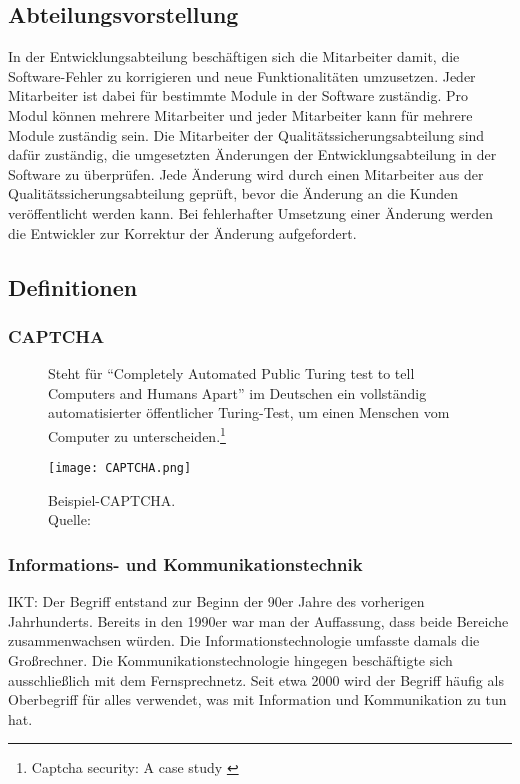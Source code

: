 \subsection{Abteilungsvorstellung}
In der Entwicklungsabteilung beschäftigen sich die Mitarbeiter damit, die Software-Fehler zu korrigieren und neue Funktionalitäten umzusetzen. Jeder Mitarbeiter ist dabei für bestimmte Module in der Software zuständig. Pro Modul können mehrere Mitarbeiter und jeder Mitarbeiter kann für mehrere Module zuständig sein. Die Mitarbeiter der Qualitätssicherungsabteilung sind dafür zuständig, die umgesetzten Änderungen der Entwicklungsabteilung in der Software zu überprüfen. Jede Änderung wird durch einen Mitarbeiter aus der Qualitätssicherungsabteilung geprüft, bevor die Änderung an die Kunden veröffentlicht werden kann. Bei fehlerhafter Umsetzung einer Änderung werden die Entwickler zur Korrektur der Änderung aufgefordert.

\subsection{Definitionen}

\subsubsection{CAPTCHA}
\begin{figure}[h]
	\begin{minipage}{0.5\textwidth}
		Steht für "`Completely Automated Public Turing test to tell Computers and Humans Apart"' im Deutschen ein vollständig automatisierter öffentlicher
		Turing-Test, um einen Menschen vom Computer zu unterscheiden.\footnote{Captcha security: A case study \cite{yan2009captcha}}
	\end{minipage}
	\hfill
	\begin{minipage}{0.4\textwidth}
		\texttt{[image: CAPTCHA.png]}
		\caption[Beispiel-CAPTCHA]{Beispiel-CAPTCHA. \\Quelle: \cite{yan2009captcha}}
	\end{minipage}
\end{figure}

\subsubsection{Informations- und Kommunikationstechnik}
\ac{IKT}: Der Begriff entstand zur Beginn der 90er Jahre des vorherigen Jahrhunderts. Bereits in den 1990er war man der Auffassung, dass beide
Bereiche zusammenwachsen würden. Die Informationstechnologie umfasste damals die Großrechner. Die Kommunikationstechnologie hingegen beschäftigte
sich ausschließlich mit dem Fernsprechnetz. Seit etwa 2000 wird der Begriff häufig als Oberbegriff für alles verwendet, was mit Information und Kommunikation
zu tun hat.
\\

